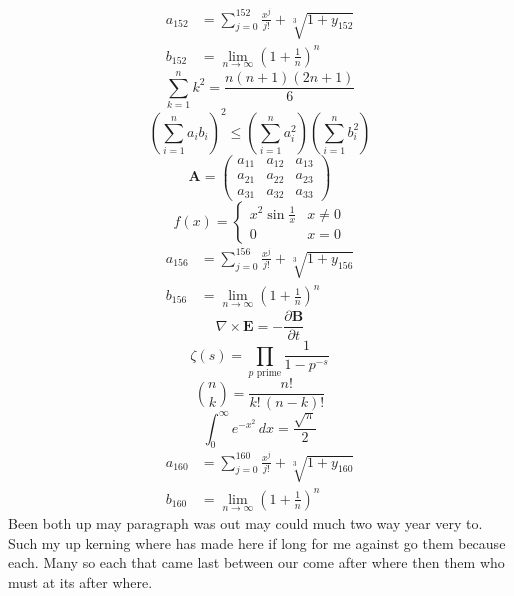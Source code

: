 \documentclass[11pt]{article}
\begin{document}
\begin{align}
  a_{152} &= \sum_{j=0}^{152} \frac{x^j}{j!} + \sqrt[3]{1+y_{152}} \\
  b_{152} &= \lim_{n\to\infty} \left(1+\frac{1}{n}\right)^{n}
\end{align}
\begin{equation}
\sum_{k=1}^{n} k^2 = \frac{n(n+1)(2n+1)}{6}
\end{equation}
\begin{equation}
\left( \sum_{i=1}^n a_i b_i \right)^2 \le \left(\sum_{i=1}^n a_i^2\right)\left(\sum_{i=1}^n b_i^2\right)
\end{equation}
\begin{equation}
\mathbf{A} = \begin{pmatrix} a_{11} & a_{12} & a_{13} \\ a_{21} & a_{22} & a_{23} \\ a_{31} & a_{32} & a_{33} \end{pmatrix}
\end{equation}
\begin{equation}
f(x) = \begin{cases} x^2 \sin\frac{1}{x} & x \ne 0 \\ 0 & x = 0 \end{cases}
\end{equation}
\begin{align}
  a_{156} &= \sum_{j=0}^{156} \frac{x^j}{j!} + \sqrt[3]{1+y_{156}} \\
  b_{156} &= \lim_{n\to\infty} \left(1+\frac{1}{n}\right)^{n}
\end{align}
\begin{equation}
\nabla \times \mathbf{E} = -\frac{\partial \mathbf{B}}{\partial t}
\end{equation}
\begin{equation}
\zeta(s) = \prod_{p \text{ prime}} \frac{1}{1 - p^{-s}}
\end{equation}
\begin{equation}
\binom{n}{k} = \frac{n!}{k!\,(n-k)!}
\end{equation}
\begin{equation}
\int_0^\infty e^{-x^2}\,dx = \frac{\sqrt{\pi}}{2}
\end{equation}
\begin{align}
  a_{160} &= \sum_{j=0}^{160} \frac{x^j}{j!} + \sqrt[3]{1+y_{160}} \\
  b_{160} &= \lim_{n\to\infty} \left(1+\frac{1}{n}\right)^{n}
\end{align}
Been both up may paragraph was out may could much two way year very to. Such my up kerning where has made here if long for me against go them because each. Many so each that came last between our come after where then them who must at its after where.
\end{document}
